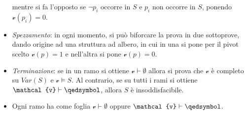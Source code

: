 \begin{itemize}
    \begin{prooftree}
    \end{prooftree}
    mentre si fa l'opposto se $\neg p_i$ occorre in $S$ e $p_i$ non occorre in $S$, ponendo $\mathcal{v}(p_i) = 0$.
  \item \textit{Spezzamento}: in ogni momento, si può biforcare la prova in due sottoprove, dando origine ad una struttura ad albero, in cui in una si pone per il pivot scelto $\mathcal{v}(p) = 1$ e nell'altra si pone $\mathcal{v}(p)= 0$. 
    \begin{prooftree}
    \end{prooftree}
  \item \textit{Terminazione}: se in un ramo si ottiene $\mathcal{v} \vdash \emptyset$ allora si prova che $\mathcal{v}$ è completo su $Var(S)$ e $\mathcal{v} \models S$. Al contrario, se su tutti i rami si ottiene $\mathcal{v} \vdash \qedsymbol$, allora $S$ è insoddisfacibile.
    \item Ogni ramo ha come foglia $\mathcal{v} \vdash \emptyset$ oppure $\mathcal{v} \vdash \qedsymbol$.
\end{itemize}
